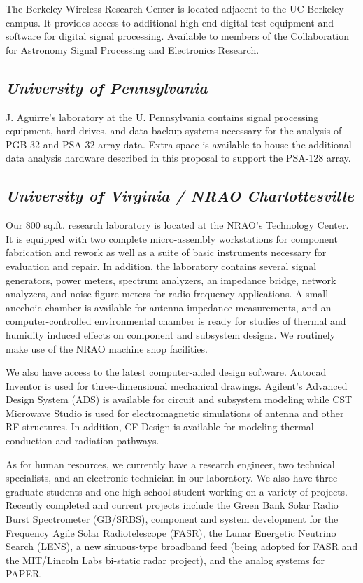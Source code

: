 \documentclass[11pt]{article}
\begin{document}
The Berkeley Wireless Research Center is located adjacent to the UC Berkeley
campus. It provides access to additional high-end digital test equipment and
software for digital signal processing.  Available to members of the
Collaboration for Astronomy Signal Processing and Electronics Research.

\subsection*{\it University of Pennsylvania}

J. Aguirre’s laboratory at the U. Pennsylvania contains signal processing
equipment, hard drives, and data backup systems necessary for the analysis of
PGB-32 and PSA-32 array data. Extra space is available to house the additional
data analysis hardware described in this proposal to support the PSA-128 array.

\subsection*{\it University of Virginia / NRAO Charlottesville}


Our 800 sq.ft. research laboratory is located at the NRAO’s Technology Center.
It is equipped with two complete micro-assembly workstations for component
fabrication and rework as well as a suite of basic instruments necessary for
evaluation and repair. In addition, the laboratory contains several signal
generators, power meters, spectrum analyzers, an impedance bridge, network
analyzers, and noise figure meters for radio frequency applications. A small
anechoic chamber is available for antenna impedance measurements, and an
computer-controlled environmental chamber is ready for studies of thermal and
humidity induced effects on component and subsystem designs. We routinely make
use of the NRAO machine shop facilities.

We also have access to the latest computer-aided design software. Autocad
Inventor is used for three-dimensional mechanical drawings. Agilent’s Advanced
Design System (ADS) is available for circuit and subsystem modeling while CST
Microwave Studio is used for electromagnetic simulations of antenna and other
RF structures. In addition, CF Design is available for modeling thermal
conduction and radiation pathways.

As for human resources, we currently have a research engineer, two technical
specialists, and an electronic technician in our laboratory. We also have three
graduate students and one high school student working on a variety of projects.
Recently completed and current projects include the Green Bank Solar Radio
Burst Spectrometer (GB/SRBS), component and system development for the
Frequency Agile Solar Radiotelescope (FASR), the Lunar Energetic Neutrino
Search (LENS), a new sinuous-type broadband feed (being adopted for FASR and
the MIT/Lincoln Labs bi-static radar project), and the analog systems for
PAPER.
\end{document}
